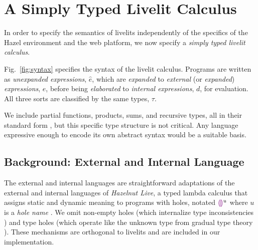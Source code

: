 \section{A Simply Typed Livelit Calculus}\label{sec:livelit-calculus}


In order to specify the semantics of livelits
independently
of the specifics of the Hazel environment and the web platform, 
we now specify a \emph{simply typed livelit calculus}.

Fig.~\ref{fig:syntax} specifies the syntax of the livelit calculus.
Programs are written as \emph{unexpanded expressions}, $\hat e$, which are \emph{expanded} to
\emph{external }(or \emph{expanded}) \emph{expressions}, $e$, before being \emph{elaborated}
to \emph{internal expressions}, $d$, for evaluation. All three sorts are classified
by the same types, $\tau$. 

We include partial functions, products, sums, and recursive
types, all in their standard form \cite{pfpl}, but this specific type structure is not critical.
Any language expressive
enough to encode its own abstract syntax 
would be a suitable basis. 



\subsection{Background: External and Internal Language}\label{sec:external-and-internal-lang}
The external and internal languages are straightforward adaptations of the
external and internal languages of \emph{Hazelnut Live},
a typed lambda calculus that assigns static and dynamic meaning to programs with holes,
notated $\textcolor{violet}{\llparenthesis}\textcolor{violet}{\rrparenthesis}^{u}$ where $u$ is a \emph{hole name} \cite{HazelnutLive}.
We omit non-empty holes (which internalize type inconsistencies \cite{Hazelnut}) and type holes
(which operate like the unknown type from gradual type theory \cite{Siek06a,Hazelnut}).
These mechanisms are orthogonal to livelits and are included in our implementation.

